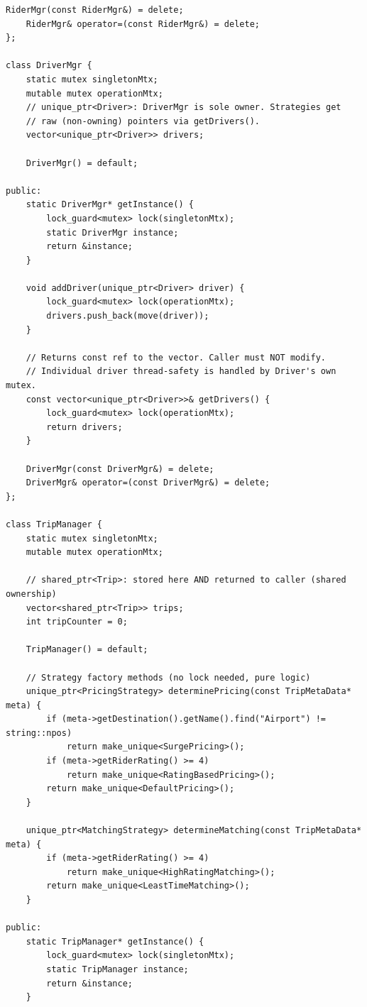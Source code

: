 \documentclass[11pt,a4paper]{article}
\begin{document}
\begin{lstlisting}[title={\texttt{managers.hpp}}]
    RiderMgr(const RiderMgr&) = delete;
    RiderMgr& operator=(const RiderMgr&) = delete;
};

class DriverMgr {
    static mutex singletonMtx;
    mutable mutex operationMtx;
    // unique_ptr<Driver>: DriverMgr is sole owner. Strategies get
    // raw (non-owning) pointers via getDrivers().
    vector<unique_ptr<Driver>> drivers;

    DriverMgr() = default;

public:
    static DriverMgr* getInstance() {
        lock_guard<mutex> lock(singletonMtx);
        static DriverMgr instance;
        return &instance;
    }

    void addDriver(unique_ptr<Driver> driver) {
        lock_guard<mutex> lock(operationMtx);
        drivers.push_back(move(driver));
    }

    // Returns const ref to the vector. Caller must NOT modify.
    // Individual driver thread-safety is handled by Driver's own mutex.
    const vector<unique_ptr<Driver>>& getDrivers() {
        lock_guard<mutex> lock(operationMtx);
        return drivers;
    }

    DriverMgr(const DriverMgr&) = delete;
    DriverMgr& operator=(const DriverMgr&) = delete;
};

class TripManager {
    static mutex singletonMtx;
    mutable mutex operationMtx;

    // shared_ptr<Trip>: stored here AND returned to caller (shared ownership)
    vector<shared_ptr<Trip>> trips;
    int tripCounter = 0;

    TripManager() = default;

    // Strategy factory methods (no lock needed, pure logic)
    unique_ptr<PricingStrategy> determinePricing(const TripMetaData* meta) {
        if (meta->getDestination().getName().find("Airport") != string::npos)
            return make_unique<SurgePricing>();
        if (meta->getRiderRating() >= 4)
            return make_unique<RatingBasedPricing>();
        return make_unique<DefaultPricing>();
    }

    unique_ptr<MatchingStrategy> determineMatching(const TripMetaData* meta) {
        if (meta->getRiderRating() >= 4)
            return make_unique<HighRatingMatching>();
        return make_unique<LeastTimeMatching>();
    }

public:
    static TripManager* getInstance() {
        lock_guard<mutex> lock(singletonMtx);
        static TripManager instance;
        return &instance;
    }


\end{lstlisting}
\end{document}
